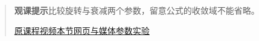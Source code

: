 \begin{quote}\small\textbf{观课提示}\quad 比较旋转与衰减两个参数，留意公式的收敛域不能省略。

\href{https://www.youtube.com/watch?v=j0wJBEZdwLs}{原课程视频}\quad\href{https://vitael04213.github.io/3blue1brown-notes/lessons/laplace-transform.html}{本节网页与媒体}\quad\href{https://vitael04213.github.io/3blue1brown-notes/lab.html\#phase}{参数实验}
\end{quote}
